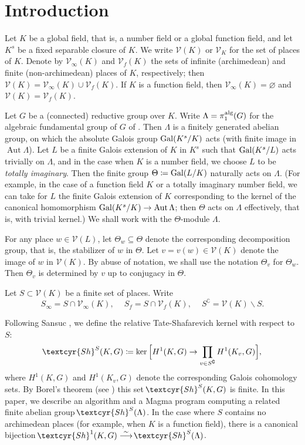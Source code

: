 \documentclass[11pt]{amsart}
\newcommand{\Sha}{{\!\textcyr{Sh}}}
\theoremstyle{plain}
\theoremstyle{definition}
\DeclareMathOperator{\Aut}{Aut}
\newcommand{\Gal}{{\rm Gal}}
\newcommand{\isoto}{\overset{\sim}{\longrightarrow}}
\newcommand{\alg}{{\rm alg}}
\newcommand{\V}{{\mathcal V}}
\begin{document}
\maketitle



\section{Introduction}

Let $K$ be a global field, that is, a number field or a global function field, and
let $K^s$ be a fixed separable closure of $K$.
We write  $\V(K)$ or $\V_K$ for the set of places of $K$.
Denote by $\V_\infty(K)$ and $\V_f(K)$ the sets of infinite (archimedean)
and finite (non-archimedean) places of $K$, respectively; then $\V(K)=\V_\infty(K)\cup\V_f(K)$.
If $K$ is a function field, then $\V_\infty(K)=\varnothing$ and $\V(K)=\V_f(K)$.

Let $G$ be a (connected) reductive group over $K$.
Write $\Lambda=\pi_1^\alg(G)$ for the algebraic fundamental group of $G$
of \cite[Section 1]{Borovoi-Memoir}.
Then $\Lambda$ is a finitely generated abelian group, on which
the absolute Galois group $\Gal(K^s/K)$ acts (with finite image in $\Aut  \Lambda$).
Let $L$ be a finite Galois extension of $K$ in $K^s$
such that $\Gal(K^s/L)$ acts trivially on $\Lambda$,
and in the case when $K$ is a number field, we choose $L$ to be {\em totally imaginary}.
Then the finite group $\Theta\coloneqq \Gal(L/K)$ naturally acts on $\Lambda$.
(For example, in the case of a function field $K$ or a totally imaginary number field,
we can take for $L$ the finite Galois extension of $K$
corresponding to the kernel of the canonical homomorphism $\Gal(K^s/K)\to\Aut  \Lambda$;
then $\Theta$ acts on $\Lambda$ effectively, that is, with trivial kernel.)
We shall work with the $\Theta$-module $\Lambda$.

For any place $w\in\V(L)$, let $\Theta_w\subseteq\Theta$
denote the corresponding decomposition group,
that is, the stabilizer of $w$ in $\Theta$.
Let $v=v(w)\in\V(K)$ denote the image of $w$ in $\V(K)$.
By abuse of notation, we shall use the notation $\Theta_v$ for $\Theta_w$.
Then $\Theta_v$ is determined by $v$ up to conjugacy in $\Theta$.

Let $S\subset \V(K)$ be a finite set of places.
Write
\[S_\infty=S\cap\V_\infty(K),\quad\  S_f=S\cap \V_f(K),\quad\
       S^\complement=\V(K)\smallsetminus S.\]

Following Sansuc \cite[Notation and conventions]{Sansuc},
we define the relative Tate-Shafarevich kernel with respect to $S$:
\[\Sha^S(K,G)\coloneqq\ker \Big[ H^1(K,G)\to\prod_{v\in S^\complement} H^1(K_v,G)\Big], \]
where $H^1(K,G)$ and $H^1(K_v,G)$ denote the corresponding Galois cohomology sets.
By Borel's theorem (see \cite[page 25]{Borel}) 
this set $\Sha^S(K,G)$ is finite.
In this paper, we describe an algorithm and a Magma program
computing a related finite abelian group $\Sha^S(\Lambda)$.
In the case where $S$ contains no archimedean places (for example, when $K$ is a function field),
there is a canonical bijection $\Sha^1(K,G)\isoto\Sha^S(\Lambda)$.
\end{document}
